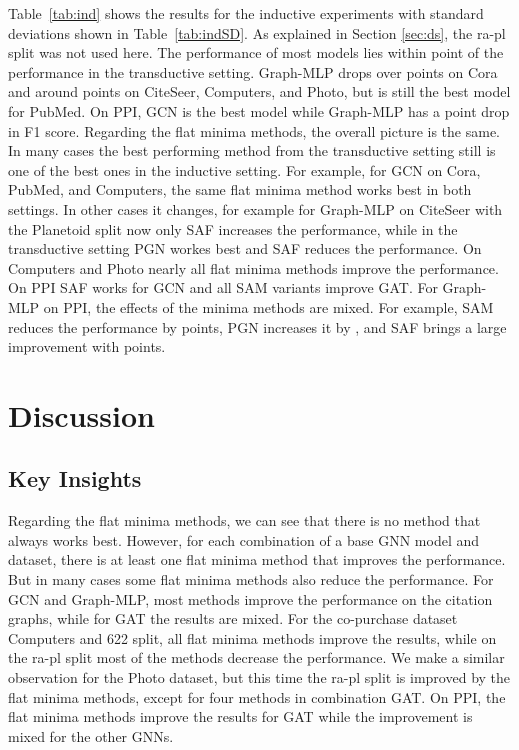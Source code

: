 \documentclass[runningheads]{llncs}
\newcommand{\GraphMLP}{Graph-MLP\xspace}
\begin{document}
Table~\ref{tab:ind} shows the results for the inductive experiments with standard deviations shown in Table~\ref{tab:indSD}.
As explained in Section \ref{sec:ds}, the ra-pl split was not used here.
The performance of most models lies within  point of the performance in the transductive setting.
\GraphMLP drops over  points on Cora and around  points on CiteSeer, Computers, and Photo, but is still the best model for PubMed.
On PPI, GCN is the best model while \GraphMLP has a  point drop in F1 score.
Regarding the flat minima methods, the overall picture is the same.
In many cases the best performing method from the transductive setting still is one of the best ones in the inductive setting.
For example, for GCN on Cora, PubMed, and Computers, the same flat minima method works best in both settings.
In other cases it changes, for example for \GraphMLP on CiteSeer with the Planetoid split now only SAF increases the performance, while in the transductive setting PGN workes best and SAF reduces the performance.
On Computers and Photo nearly all flat minima methods improve the performance.
On PPI SAF works for GCN and all SAM variants improve GAT.
For \GraphMLP on PPI, the effects of the minima methods are mixed. 
For example, SAM reduces the performance by  points, PGN increases it by , and SAF brings a large improvement with  points.



\section{Discussion}
\label{sec:discussion}

\subsection{Key Insights}Regarding the flat minima methods, we can see that there is no method that always works best.
However, for each combination of a base GNN model and dataset, there is at least one flat minima method that improves the performance.
But in many cases some flat minima methods also reduce the performance.
For GCN and \GraphMLP, most methods improve the performance on the citation graphs, while for GAT the results are mixed. 
For the co-purchase dataset Computers and 622 split, all flat minima methods improve the results, while on the ra-pl split most of the methods decrease the performance.
We make a similar observation for the Photo dataset, but this time the ra-pl split is improved by the flat minima methods, except for four methods in combination GAT.
On PPI, the flat minima methods improve the results for GAT while the improvement is mixed for the other GNNs.
\end{document}
